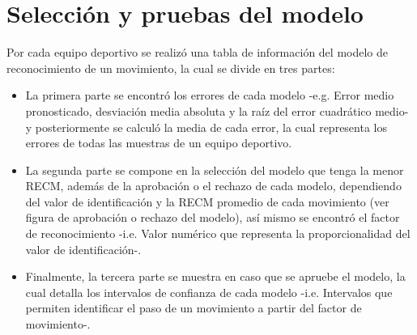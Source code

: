 \section{Selecci\'on y pruebas del modelo} \label{res:chooseModel}
Por cada equipo deportivo se realiz\'o una tabla de informaci\'on del modelo de reconocimiento de un movimiento, la cual se divide en tres partes:
\begin{itemize}
\item  La primera parte se encontr\'o los errores de cada modelo -e.g. Error medio pronosticado, desviaci\'on media absoluta y la ra\'iz del error cuadr\'atico medio- y posteriormente se calcul\'o la media de cada error, la cual representa los  errores de todas las muestras de un equipo deportivo.
\item  La segunda parte se compone en la selecci\'on del modelo que tenga la menor RECM, adem\'as de la aprobaci\'on o el rechazo de cada modelo, dependiendo del valor de identificaci\'on y la RECM promedio de cada movimiento (ver figura de aprobaci\'on o rechazo del modelo), as\'i mismo se encontr\'o el factor de reconocimiento  -i.e. Valor num\'erico que representa la proporcionalidad del valor de identificaci\'on-.
\item Finalmente, la tercera parte se muestra en caso que se apruebe el modelo, la cual detalla los intervalos de confianza de cada modelo -i.e. Intervalos que permiten identificar el paso de un movimiento a partir del factor de movimiento-.
\end{itemize}
